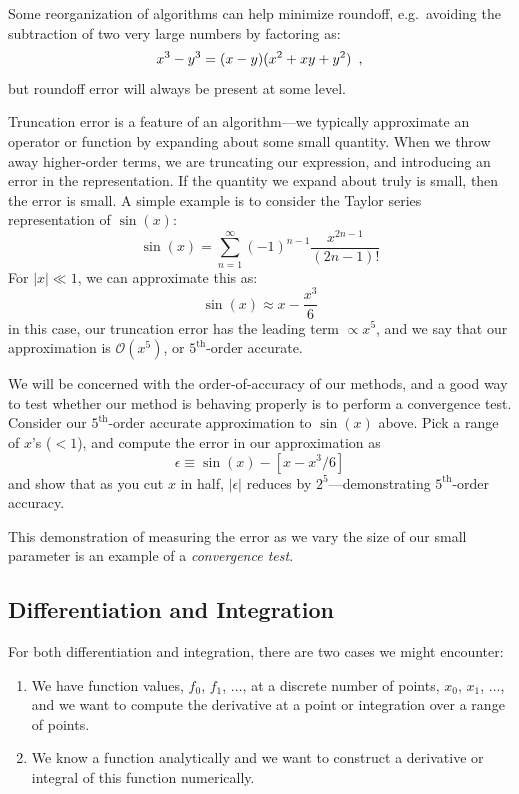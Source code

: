 Some reorganization of algorithms can help minimize roundoff,
e.g.\ avoiding the subtraction of two very large numbers by factoring as:
\begin{equation}
x^3 - y^3 = (x - y)(x^2 + xy + y^2) \enskip ,
\end{equation}
but roundoff error will always be present at some level.

Truncation error is a feature of an algorithm---we typically
approximate an operator or function by expanding about some small
quantity.  When we throw away higher-order terms, we are truncating
our expression, and introducing an error in the representation.  If
the quantity we expand about truly is small, then the error is small.
A simple example is to consider the Taylor series representation of
$\sin(x)$:
\begin{equation}
\sin(x) = \sum_{n=1}^\infty (-1)^{n-1} \frac{x^{2n-1}}{(2n-1)!}
\end{equation}
For $|x| \ll 1$, we can approximate this as:
\begin{equation}
\sin(x) \approx x - \frac{x^3}{6}
\end{equation}
in this case, our truncation error has the leading term $\propto x^5$,
and we say that our approximation is $\mathcal{O}(x^5)$, or
$5^\mathrm{th}$-order accurate.

\begin{exercise}
We will be concerned with the order-of-accuracy of our methods, and a
good way to test whether our method is behaving properly is to perform
a convergence test.  Consider our $5^\mathrm{th}$-order accurate
approximation to $\sin(x)$ above.  Pick a range of $x$'s ($< 1$), and
compute the error in our approximation as
\begin{equation*}
\epsilon \equiv \sin(x) - [  x - x^3/6 ]
\end{equation*}
and show that as you cut $x$ in half, $|\epsilon|$
reduces by $2^5$---demonstrating $5^\mathrm{th}$-order accuracy.
\end{exercise}

This demonstration of measuring the error as we vary the size
of our small parameter is an example of a {\em convergence test}.

\subsection{Differentiation and Integration}

For both differentiation and integration, there are two cases we might
encounter:
\begin{enumerate}
\item We have function values, $f_0$, $f_1$, $\ldots$, at a discrete
  number of points, $x_0$, $x_1$, $\ldots$, and we want to compute the
  derivative at a point or integration over a range of points.
\item We know a function analytically and we want to construct a
  derivative or integral of this function numerically. 
\end{enumerate}


